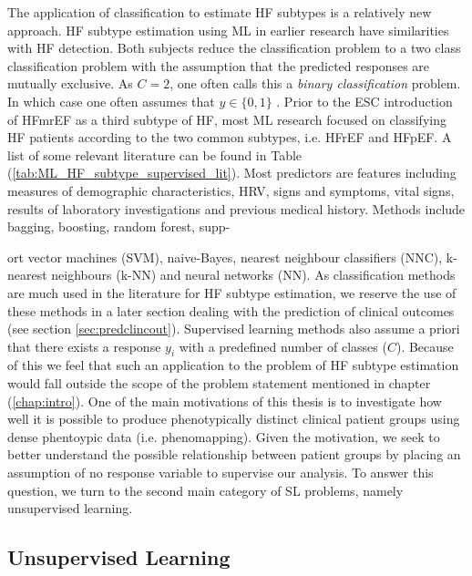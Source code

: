 \documentclass[../thesis.tex]{subfiles}
\begin{document}
\indent The application of classification to estimate HF subtypes is a relatively new approach. HF subtype estimation using ML in earlier research have similarities with HF detection. Both subjects reduce the classification problem to a two class classification problem with the assumption that the predicted responses are mutually exclusive. As $C = 2$, one often calls this a \textit{binary classification} problem. In which case one often assumes that $y \in \{0,1\}$ \citep{muphy2012machine}. Prior to the ESC introduction of HFmrEF as a third subtype of HF, most ML research focused on classifying HF patients according to the two common subtypes, i.e. HFrEF and HFpEF. A list of some relevant literature can be found in Table (\ref{tab:ML_HF_subtype_supervised_lit}). Most predictors are features including measures of demographic characteristics, HRV, signs and symptoms, vital signs, results of laboratory investigations and previous medical history. Methods include bagging, boosting, random forest, supp-



\noindent ort vector machines (SVM), naive-Bayes, nearest neighbour classifiers (NNC), k-nearest neighbours (k-NN) and neural networks (NN). As classification methods are much used in the literature for HF subtype estimation, we reserve the use of these methods in a later section dealing with the prediction of clinical outcomes (see section \ref{sec:predclincout}). Supervised learning methods also assume a priori that there exists a response $y_i$ with a predefined number of classes ($C$). Because of this we feel that such an application to the problem of HF subtype estimation would fall outside the scope of the problem statement mentioned in chapter (\ref{chap:intro}). One of the main motivations of this thesis is to investigate how well it is possible to produce phenotypically distinct clinical patient groups using dense phentoypic data (i.e. phenomapping). Given the motivation, we seek to better understand the possible relationship between patient groups by placing an assumption of no response variable to supervise our analysis. To answer this question, we turn to the second main category of SL problems, namely unsupervised learning.


\subsection{Unsupervised Learning}
\label{subsec:unsupervisedlearn}
\end{document}
